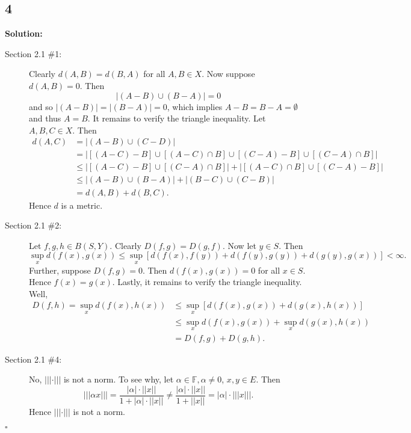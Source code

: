 \documentclass[12pt]{article}
\newcounter{ProofCounter}
\newenvironment{Solution}{\stepcounter{ProofCounter}\textbf{Solution:}}{\hfill$\square$}
\begin{document}
\subsection*{4}
\begin{Solution}
  \begin{description}
    \item[Section 2.1 \#1:] Clearly $d(A,B) = d(B, A)$ for all $A, B \in X$. Now suppose $d(A,B) = 0$. Then
      \[
        |(A-B)\cup (B-A)| = 0
      \]
      and so $|(A-B)| = |(B-A)| = 0$, which implies $A-B = B-A = \emptyset$ and thus $A = B$. It remains to verify the triangle inequality. Let $A, B,
      C \in X$. Then
      \begin{align*}
        d(A,C) & = |(A-B)\cup (C-D)| \\
        & = \big| [(A-C)-B]\cup[(A-C)\cap B] \cup [(C-A)-B] \cup [(C-A)\cap B] \bigg| \\
        & \leq \bigg| [(A-C)-B] \cup [(C-A)\cap B] \bigg| + \bigg| [(A-C)\cap B] \cup [(C-A) - B] \bigg| \\
        & \leq \bigg| (A-B) \cup (B-A) \bigg| + \bigg| (B-C) \cup (C-B) \bigg| \\
        & = d(A,B) + d(B,C).
      \end{align*}
      Hence $d$ is a metric.

    \item[Section 2.1 \#2:] Let $f,g,h \in B(S,Y)$. Clearly $D(f,g) = D(g,f)$. Now let $y \in S$. Then 
      \[
        \sup_x d\left( f(x), g(x) \right) \leq \sup_x \left[ d\left( f(x),f(y) \right) + d\left( f(y),g(y) \right) + d\left( g(y), g(x) \right)\right] < \infty.
      \]
      Further, suppose $D(f,g) = 0$. Then $d\left( f(x),g(x) \right) = 0$ for all $x \in S$. Hence $f(x) = g(x)$.
      Lastly, it remains to verify the triangle inequality. Well,
      \begin{align*}
        D(f,h) = \sup_x d\left( f(x),h(x) \right) & \leq \sup_x \left[ d\left( f(x),g(x) \right) + d\left( g(x),h(x) \right) \right] \\
        & \leq \sup_x d\left( f(x),g(x) \right) + \sup_x d\left( g(x), h(x) \right) \\
        & = D(f,g) + D(g,h).
      \end{align*}

    \item[Section 2.1 \#4:] No, $|||\cdot |||$ is not a norm. To see why, let $\alpha \in \mathbb{F}, \alpha\neq 0$, $x,y \in E$. Then
      \[
        |||\alpha x||| = \frac{ |\alpha| \cdot ||x||}{1 + |\alpha| \cdot ||x||} \neq \frac{ |\alpha| \cdot ||x||}{1 + ||x||} = |\alpha|\cdot |||x|||.
      \]
      Hence $|||\cdot |||$ is not a norm.
  \end{description}
\end{Solution}
\end{document}
